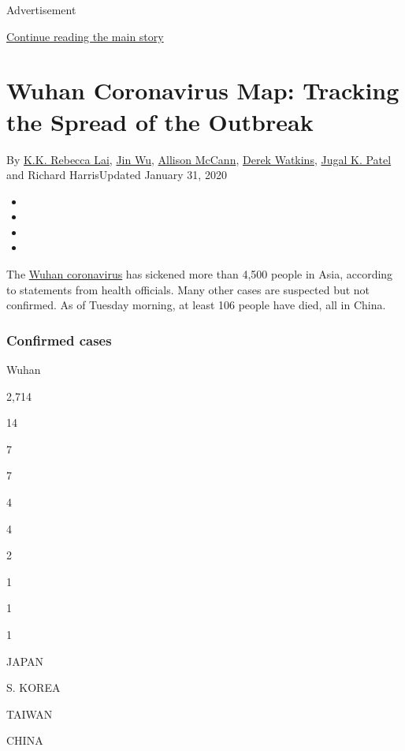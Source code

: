 Advertisement

\protect\hyperlink{after-top}{Continue reading the main story}

\hypertarget{wuhan-coronavirus-map-tracking-the-spread-of-the-outbreak}{%
\section{Wuhan Coronavirus Map: Tracking the Spread of the
Outbreak}\label{wuhan-coronavirus-map-tracking-the-spread-of-the-outbreak}}

By \href{https://www.nytimes.com/by/kk-rebecca-lai}{K.K. Rebecca Lai},
\href{https://www.nytimes.com/by/jin-wu}{Jin Wu},
\href{https://www.nytimes.com/by/allison-mccann}{Allison McCann},
\href{https://www.nytimes.com/by/derek-watkins}{Derek Watkins},
\href{https://www.nytimes.com/by/jugal-k-patel}{Jugal K. Patel} and
Richard HarrisUpdated January 31, 2020

\begin{itemize}
\item
\item
\item
\item
\end{itemize}

The
\href{https://www.nytimes.com/2020/01/28/world/asia/china-coronavirus.html}{Wuhan
coronavirus} has sickened more than 4,500 people in Asia, according to
statements from health officials. Many other cases are suspected but not
confirmed. As of Tuesday morning, at least 106 people have died, all in
China.

\hypertarget{confirmed-cases}{%
\subsubsection{Confirmed cases}\label{confirmed-cases}}

Wuhan

2,714

14

7

7

4

4

2

1

1

1

JAPAN

S. KOREA

TAIWAN

CHINA

